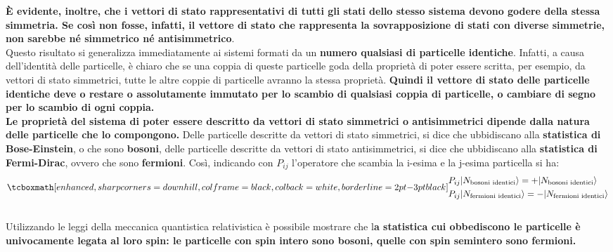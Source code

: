 \documentclass[a4paper,12pt,oneside]{book}
\begin{document}
\textbf{È evidente, inoltre, che i vettori di stato rappresentativi di tutti gli stati dello stesso sistema devono godere della stessa simmetria. Se così non fosse, infatti, il vettore di stato che rappresenta la sovrapposizione di stati con diverse simmetrie, non sarebbe né simmetrico né antisimmetrico}.\\

Questo risultato si generalizza immediatamente ai sistemi formati da un \textbf{numero qualsiasi di particelle identiche}. Infatti, a causa dell'identità delle particelle, è chiaro che se una coppia di queste particelle goda della proprietà di poter essere scritta, per esempio, da vettori di stato simmetrici, tutte le altre coppie di particelle avranno la stessa proprietà. \textbf{Quindi il vettore di stato delle particelle identiche deve o restare o assolutamente immutato per lo scambio di qualsiasi coppia di particelle, o cambiare di segno per lo scambio di ogni coppia.}\\

\textbf{Le proprietà del sistema di poter essere descritto da vettori di stato simmetrici o antisimmetrici dipende dalla natura delle particelle che lo compongono.} Delle particelle descritte da vettori di stato simmetrici, si dice che ubbidiscano alla \textbf{statistica di Bose-Einstein}, o che sono \textbf{bosoni}, delle particelle descritte da vettori di stato antisimmetrici, si dice che ubbidiscano alla \textbf{statistica di Fermi-Dirac}, ovvero che sono \textbf{fermioni}. Così, indicando con $P_{ij}$ l'operatore che scambia la i-esima e la j-esima particella si ha:
	\begin{equation}
		\tcboxmath[enhanced, sharp corners=downhill, colframe=black, colback=white, borderline={2pt}{-3pt}{black}]{
		\begin{aligned}
			&P_{ij} |N_{\textrm{bosoni identici}}\rangle= +|N_{\textrm{bosoni identici}}\rangle  \\
			&P_{ij} |N_{\textrm{fermioni identici}}\rangle= -|N_{\textrm{fermioni identici}}\rangle 
		\end{aligned}
		}
	\end{equation}\\
	
Utilizzando le leggi della meccanica quantistica relativistica è possibile mostrare che l\textbf{a statistica cui obbediscono le particelle è univocamente legata al loro spin: le particelle con spin intero sono bosoni, quelle con spin semintero sono fermioni.}\\
\end{document}
